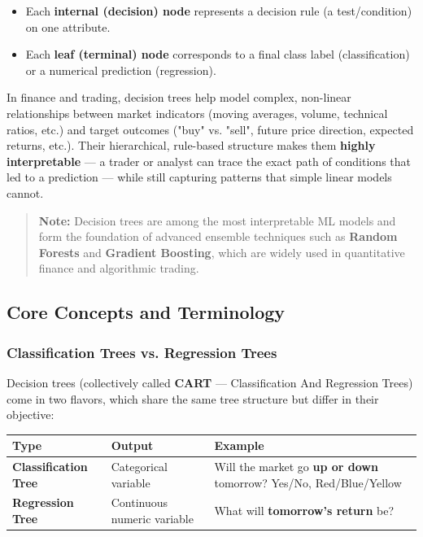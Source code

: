 \documentclass[12pt,openany]{book}
\begin{document}
\begin{itemize}[leftmargin=*]
    \item Each \textbf{internal (decision) node} represents a decision rule (a test/condition) on one attribute.
    \item Each \textbf{leaf (terminal) node} corresponds to a final class label (classification) or a numerical prediction (regression).

\end{itemize}

In finance and trading, decision trees help model complex, non-linear relationships between market indicators (moving averages, volume, technical ratios, etc.) and target outcomes ("buy" vs. "sell", future price direction, expected returns, etc.). Their hierarchical, rule-based structure makes them \textbf{highly interpretable} --- a trader or analyst can trace the exact path of conditions that led to a prediction --- while still capturing patterns that simple linear models cannot.

\begin{quote}
\textbf{Note:} Decision trees are among the most interpretable ML models and form the foundation of advanced ensemble techniques such as \textbf{Random Forests} and \textbf{Gradient Boosting}, which are widely used in quantitative finance and algorithmic trading.
\end{quote}


\medskip


\subsection{Core Concepts and Terminology}


\subsubsection{Classification Trees vs. Regression Trees}

Decision trees (collectively called \textbf{CART} --- Classification And Regression Trees) come in two flavors, which share the same tree structure but differ in their objective:

\begin{center}
\small
\renewcommand{\arraystretch}{1.15}
\begin{tabular}{|L{0.24\textwidth}|L{0.26\textwidth}|L{0.38\textwidth}|}
\hline
    Type & Output & Example \\
\hline
    \textbf{Classification Tree} & Categorical variable & Will the market go \textbf{up or down} tomorrow? Yes/No, Red/Blue/Yellow \\
\hline
    \textbf{Regression Tree} & Continuous numeric variable & What will \textbf{tomorrow's return} be? \\
\hline
\end{tabular}
\end{center}
\normalsize
\end{document}
